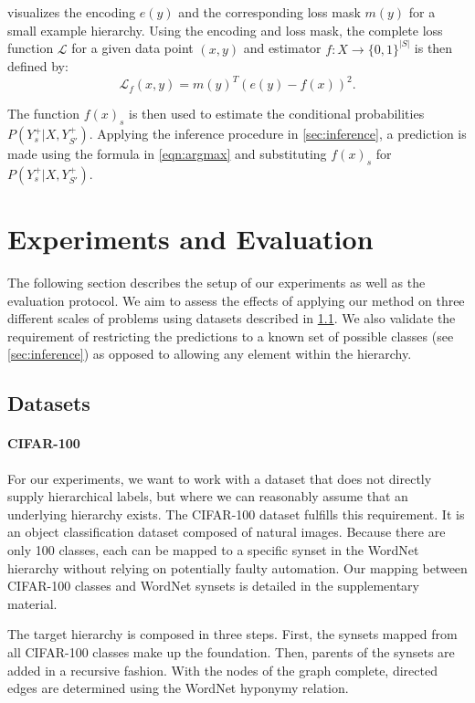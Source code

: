 \documentclass[10pt,twocolumn,letterpaper]{article}
\begin{document}
 visualizes the encoding $e(y)$ and the corresponding loss mask $m(y)$ for a
small example hierarchy. Using the encoding and loss mask, the
complete loss function $\mathcal{L}$ for a given data point $(x,y)$ and estimator $f: X \to \{0,1\}^{|S|}$ is then defined
by:
\begin{equation}
\mathcal{L}_f(x,y) = m(y)^T(e(y) - f(x))^2.
\end{equation}

The function $f(x)_s$ is then used to estimate the conditional probabilities $P(Y_s^+|X, Y_{S'}^+)$.
Applying the inference procedure in \cref{sec:inference}, a prediction is made
using the formula in \cref{eqn:argmax} and substituting $f(x)_s$ for $P(Y_s^+|X, Y_{S'}^+)$.

\section{Experiments and Evaluation}
The following section describes the setup of our experiments as well as the evaluation protocol.
We aim to assess the effects of applying our method on three different scales of problems using datasets
described in \cref{sec:expdata}. We also validate the requirement of restricting the predictions to
a known set of possible classes (see \cref{sec:inference}) as opposed to allowing any element within the hierarchy.

\subsection{Datasets}
\label{sec:expdata}
\paragraph{CIFAR-100}
For our experiments, we want to work with a dataset that does not directly supply hierarchical labels,
but where we can reasonably assume that an underlying hierarchy exists.
The CIFAR-100 dataset \cite{Krizhevsky2009CIFAR} fulfills this requirement. It is an
object classification dataset composed of natural images. Because there are only 100
classes, each can be mapped to a specific synset in the WordNet hierarchy without
relying on potentially faulty automation.
Our mapping between CIFAR-100 classes and WordNet synsets is detailed in the supplementary material.

The target hierarchy is composed in three steps. First, the synsets mapped from all CIFAR-100
classes make up the foundation. Then, parents of the synsets are added in a recursive fashion.
With the nodes of the graph complete, directed edges are determined using the WordNet
hyponymy relation.
\end{document}
